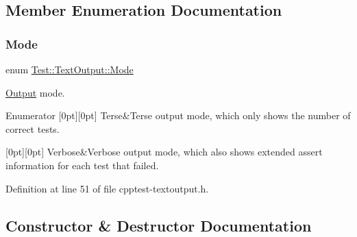\subsection{Member Enumeration Documentation}
\mbox{\label{class_test_1_1_text_output_ae7b22c9458e6c566996bf4517c73feb1}} 
\subsubsection{\texorpdfstring{Mode}{Mode}}
{\footnotesize\ttfamily enum \mbox{\hyperlink{class_test_1_1_text_output_ae7b22c9458e6c566996bf4517c73feb1}{Test\+::\+Text\+Output\+::\+Mode}}}

\mbox{\hyperlink{class_test_1_1_output}{Output}} mode. \begin{DoxyEnumFields}{Enumerator}
[0pt][0pt]{}\mbox{\label{class_test_1_1_text_output_ae7b22c9458e6c566996bf4517c73feb1ae63930203459836dfc6e0939f92a9fb2}} 
Terse&Terse output mode, which only shows the number of correct tests. \\
\hline

[0pt][0pt]{}\mbox{\label{class_test_1_1_text_output_ae7b22c9458e6c566996bf4517c73feb1a85dd6e42f6261a23fd504201f5cc2792}} 
Verbose&Verbose output mode, which also shows extended assert information for each test that failed. \\
\hline

\end{DoxyEnumFields}


Definition at line 51 of file cpptest-\/textoutput.\+h.



\subsection{Constructor \& Destructor Documentation}
\mbox{\label{class_test_1_1_text_output_ab9bdd9b2d9b362ca5fb148b766ecdd02}} 
